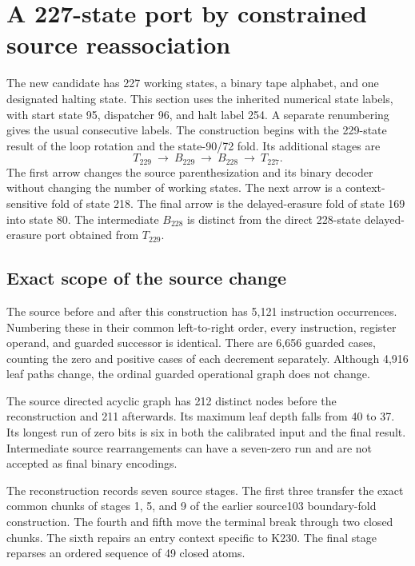 \section{A 227-state port by constrained source reassociation}
\label{sec:source227}

The new candidate has 227 working states, a binary tape alphabet, and one
designated halting state.  This section uses the inherited numerical state
labels, with start state 95, dispatcher 96, and halt label 254.  A separate
renumbering gives the usual consecutive labels.  The construction begins
with the 229-state result of the loop rotation and the state-90/72 fold.
Its additional stages are
\[
 T_{229}\ \longrightarrow\ B_{229}\ \longrightarrow\ B_{228}
 \ \longrightarrow\ T_{227}.
\]
The first arrow changes the source parenthesization and its binary decoder
without changing the number of working states.  The next arrow is a
context-sensitive fold of state 218.  The final arrow is the delayed-erasure
fold of state 169 into state 80.  The intermediate $B_{228}$ is distinct
from the direct 228-state delayed-erasure port obtained from $T_{229}$.

\subsection{Exact scope of the source change}

The source before and after this construction has 5,121 instruction
occurrences.  Numbering these in their common left-to-right order, every
instruction, register operand, and guarded successor is identical.  There
are 6,656 guarded cases, counting the zero and positive cases of each
decrement separately.  Although 4,916 leaf paths change, the ordinal
guarded operational graph does not change.

The source directed acyclic graph has 212 distinct nodes before the
reconstruction and 211 afterwards.  Its maximum leaf depth falls from 40
to 37.  Its longest run of zero bits is six in both the calibrated input
and the final result.  Intermediate source rearrangements can have a
seven-zero run and are not accepted as final binary encodings.

The reconstruction records seven source stages.  The first three transfer
the exact common chunks of stages 1, 5, and 9 of the earlier source103
boundary-fold construction.  The fourth and fifth move the terminal
break through two closed chunks.  The sixth repairs an entry context
specific to K230.  The final stage reparses an ordered sequence of 49
closed atoms.

